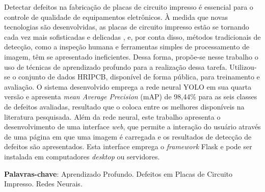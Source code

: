 \documentclass[
	12pt,				%
	openright,			%
	oneside,			%
	a4paper,			%
	chapter=TITLE,		%
	english,			%
	french,				%
	spanish,			%
	brazil				%
	]{abntex2}
\begin{document}
\setlength{\absparsep}{18pt} %
\begin{resumo}

Detectar defeitos na fabricação de placas de circuito impresso é essencial para o controle de qualidade de equipamentos eletrônicos. À medida que
novas tecnologias são desenvolvidas, as placas de circuito impresso estão se tornando cada vez mais sofisticadas e delicadas \cite{ref:Hu-Wang}, e, por conta disso, métodos tradicionais de detecção, como a inspeção humana e ferramentas simples de processamento de imagem, têm se apresentado ineficientes. Dessa forma, propõe-se nesse trabalho o uso de técnicas de aprendizado profundo para a realização dessa tarefa. Utilizou-se o conjunto de dados HRIPCB, disponível de forma pública, para treinamento e avaliação. O sistema desenvolvido emprega a rede neural YOLO em sua quarta versão e apresenta \textit{mean Average Precision} (mAP) de 98,44\% para as seis classes de defeitos avaliadas, resultado que o coloca entre os melhores disponíveis na literatura pesquisada. Além da rede neural, este trabalho apresenta o desenvolvimento de uma interface \textit{web}, que permite a interação do usuário através de uma página em que uma imagem é carregada e os resultados de detecção de defeitos são apresentados. Esta interface emprega o \textit{framework} Flask e pode ser instalada em computadores \textit{desktop} ou servidores.

 
\textbf{Palavras-chave}: Aprendizado Profundo. Defeitos em Placas de Circuito Impresso. Redes Neurais.
\end{resumo}
\end{document}
